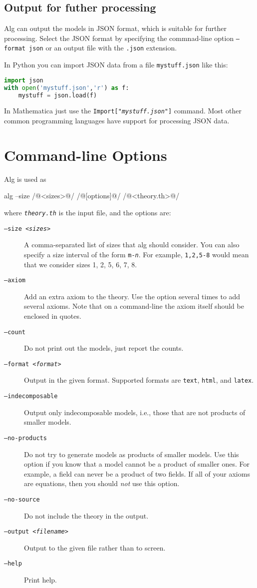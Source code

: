 \documentclass{article}
\begin{document}
\subsection{Output for futher processing}

Alg can output the models in JSON format, which is suitable for
further processing. Select the JSON format by specifying the
commnad-line option \texttt{--format json} or an output file with the
\texttt{.json} extension.

In Python you can import JSON data from a file
\texttt{mystuff.json} like this:
%
\begin{lstlisting}[language=python,basicstyle=\ttfamily\small]
import json
with open('mystuff.json','r') as f:
    mystuff = json.load(f)
\end{lstlisting}
%
In Mathematica just use the \texttt{Import["\textit{mystuff.json}"]}
command. Most other common programming languages have support for
processing JSON data.


\section{Command-line Options}
\label{sec:command-line-options}

Alg is used as
%
\begin{shell}
alg --size /@<sizes>@/ /@[options]@/ /@<theory.th>@/
\end{shell}
%
where \texttt{\textit{theory.th}} is the input file, and the options are:
%
\begin{description}
\item[\texttt{--size \textit{<sizes>}}]
  A comma-separated list of sizes that alg should consider. You can
  also specify a size interval of the form
  \texttt{\texttt{m}-\textit{n}}. For example, \texttt{1,2,5-8} would
  mean that we consider sizes 1, 2, 5, 6, 7, 8.
\item[\texttt{--axiom}]
  Add an extra axiom to the theory. Use the option several times to
  add several axioms. Note that on a command-line the axiom itself
  should be enclosed in quotes.
\item[\texttt{--count}]
  Do not print out the models, just report the counts.
\item[\texttt{--format \textit{<format>}}]
  Output in the given format. Supported formats are \texttt{text},
  \texttt{html}, and \texttt{latex}.
\item[\texttt{--indecomposable}]
  Output only indecomposable models, i.e., those that are not products
  of smaller models.
\item[\texttt{--no-products}]
  Do not try to generate models as products of smaller models. Use
  this option if you know that a model cannot be a product of smaller
  ones. For example, a field can never be a product of two fields. If
  all of your axioms are equations, then you should \emph{not} use
  this option.
\item[\texttt{--no-source}]
  Do not include the theory in the output.
\item[\texttt{--output \textit{<filename>}}]
  Output to the given file rather than to screen.
\item[\texttt{--help}]
  Print help.
\end{description}
\end{document}
